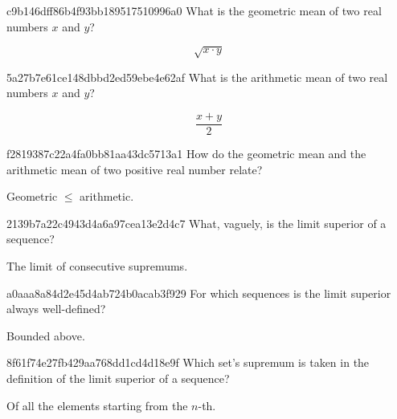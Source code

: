 \begin{note}{c9b146dff86b4f93bb189517510996a0}
    What is the geometric mean of two real numbers \({ x }\) and \({ y }\)?

    \begin{cloze}{1}
        \[
            \sqrt{x \cdot y}
        \]
    \end{cloze}
\end{note}

\begin{note}{5a27b7e61ce148dbbd2ed59ebe4e62af}
    What is the arithmetic mean of two real numbers \({ x }\) and \({ y }\)?

    \begin{cloze}{1}
        \[
            \frac{x + y}{2}
        \]
    \end{cloze}
\end{note}

\begin{note}{f2819387c22a4fa0bb81aa43dc5713a1}
    How do the geometric mean and the arithmetic mean of two positive real number relate?

    \begin{cloze}{1}
        Geometric \({ \leq }\) arithmetic.
    \end{cloze}
\end{note}

\begin{note}{2139b7a22c4943d4a6a97cea13e2d4c7}
    What, vaguely, is the limit superior of a sequence?

    \begin{cloze}{1}
        The limit of consecutive supremums.
    \end{cloze}
\end{note}

\begin{note}{a0aaa8a84d2e45d4ab724b0acab3f929}
    For which sequences is the limit superior always well-defined?

    \begin{cloze}{1}
        Bounded above.
    \end{cloze}
\end{note}

\begin{note}{8f61f74e27fb429aa768dd1cd4d18e9f}
    Which set's supremum is taken in the definition of the limit superior of a sequence?

    \begin{cloze}{1}
        Of all the elements starting from the \({ n }\)-th.
    \end{cloze}
\end{note}

